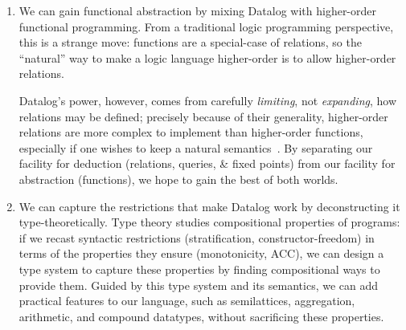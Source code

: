 \begin{enumerate}
\item We can gain functional abstraction by mixing Datalog with higher-order
  functional programming. From a traditional logic programming perspective, this
  is a strange move: functions are a special-case of relations, so the
  ``natural'' way to make a logic language higher-order is to allow higher-order
  relations.

  Datalog's power, however, comes from carefully \emph{limiting}, not
  \emph{expanding}, how relations may be defined; precisely because of their
  generality, higher-order relations are more complex to implement than
  higher-order functions, especially if one wishes to keep a natural
  semantics~\citep{DBLP:journals/tocl/CharalambidisHRW13}. By separating our
  facility for deduction (relations, queries, \& fixed points) from our facility
  for abstraction (functions), we hope to gain the best of both worlds.


\item We can capture the restrictions that make Datalog work by deconstructing
  it type-theoretically. Type theory studies compositional properties of
  programs: if we recast syntactic restrictions (stratification,
  constructor-freedom) in terms of the properties they ensure (monotonicity,
  ACC), we can design a type system to capture these properties by finding
  compositional ways to provide them.
%
  Guided by this type system and its semantics, we can add practical
  features to our language, such as semilattices, aggregation, arithmetic, and
  compound datatypes, without sacrificing these properties.


\end{enumerate}
